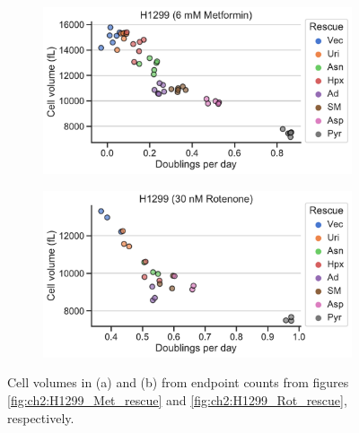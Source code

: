 \begin{figure}
     \centering
     \begin{subfigure}[b]{0.49\textwidth}
         \includegraphics[width=\textwidth]{figures/chap6/H1299_Met_cellvol.pdf}
         \caption{}
         \label{fig:ch6:H1299_Met_cellvol}
     \end{subfigure}
     \hfill
     \begin{subfigure}[b]{0.49\textwidth}
         \includegraphics[width=\textwidth]{figures/chap6/H1299_Rot_cellvol.pdf}
         \caption{}
         \label{fig:ch6:H1299_Rot_cellvol}
     \end{subfigure}
        \caption[hhhh]{
        Cell volumes in (a) and (b) from endpoint counts from figures \ref{fig:ch2:H1299_Met_rescue} and \ref{fig:ch2:H1299_Rot_rescue}, respectively.
        }
        \label{fig:ch6:H1299_ETCrescue_vol}
\end{figure}












